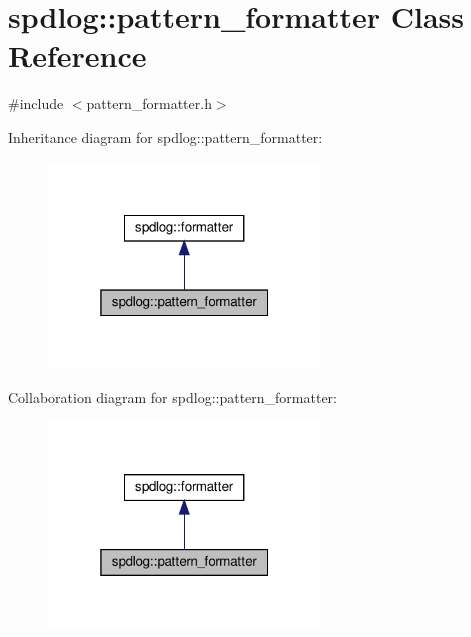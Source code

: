 \hypertarget{classspdlog_1_1pattern__formatter}{}\section{spdlog\+:\+:pattern\+\_\+formatter Class Reference}
\label{classspdlog_1_1pattern__formatter}


{\ttfamily \#include $<$pattern\+\_\+formatter.\+h$>$}



Inheritance diagram for spdlog\+:\+:pattern\+\_\+formatter\+:
\nopagebreak
\begin{figure}[H]
\begin{center}
\leavevmode
\includegraphics[width=205pt]{classspdlog_1_1pattern__formatter__inherit__graph}
\end{center}
\end{figure}


Collaboration diagram for spdlog\+:\+:pattern\+\_\+formatter\+:
\nopagebreak
\begin{figure}[H]
\begin{center}
\leavevmode
\includegraphics[width=205pt]{classspdlog_1_1pattern__formatter__coll__graph}
\end{center}
\end{figure}
